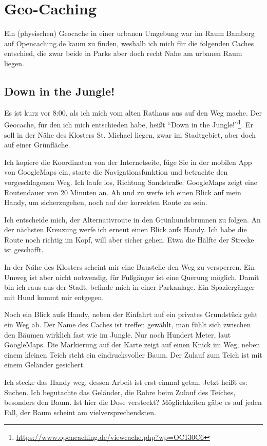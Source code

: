 \section{Geo-Caching}

Ein (physischen) Geocache in einer urbanen Umgebung war im Raum Bamberg auf Opencaching.de kaum zu finden, weshalb ich mich für die folgenden Caches entschied, die zwar beide in Parks aber doch recht Nahe am urbanen Raum liegen.

\subsection*{Down in the Jungle!}

Es ist kurz vor 8:00, als ich mich vom alten Rathaus aus auf den Weg mache. Der Geocache, für den ich mich entschieden habe, heißt \enquote{Down in the Jungle!}\footnote{\url{https://www.opencaching.de/viewcache.php?wp=OC130C6}}. Er soll in der Nähe des Klosters St. Michael liegen, zwar im Stadtgebiet, aber doch auf einer Grünfläche.

Ich kopiere die Koordinaten von der Internetseite, füge Sie in der mobilen App von GoogleMaps ein, starte die Navigationsfunktion und betrachte den vorgeschlagenen Weg. Ich laufe los, Richtung Sandstraße. GoogleMaps zeigt eine Routendauer von 20 Minuten an. Ab und zu werfe ich einen Blick auf mein Handy, um sicherzugehen, noch auf der korrekten Route zu sein.

Ich entscheide mich, der Alternativroute in den Grünhundsbrunnen zu folgen. An der nächsten Kreuzung werfe ich erneut einen Blick aufs Handy. Ich habe die Route noch richtig im Kopf, will aber sicher gehen. Etwa die Hälfte der Strecke ist geschafft.

In der Nähe des Klosters scheint mir eine Baustelle den Weg zu versperren. Ein Umweg ist aber nicht notwendig, für Fußgänger ist eine Querung möglich. Damit bin ich raus aus der Stadt, befinde mich in einer Parkanlage. Ein Spaziergänger mit Hund kommt mir entgegen.

Noch ein Blick aufs Handy, neben der Einfahrt auf ein privates Grundstück geht ein Weg ab. Der Name des Caches ist treffen gewählt, man fühlt sich zwischen den Bäumen wirklich fast wie im Jungle. Nur noch Hundert Meter, laut GoogleMaps. Die Markierung auf der Karte zeigt auf einen Knick im Weg, neben einem kleinen Teich steht ein eindrucksvoller Baum. Der Zulauf zum Teich ist mit einem Geländer gesichert.

Ich stecke das Handy weg, dessen Arbeit ist erst einmal getan. Jetzt heißt es: Suchen. Ich begutachte das Geländer, die Rohre beim Zulauf des Teiches, besonders den Baum. Ist hier die Dose versteckt? Möglichkeiten gäbe es auf jeden Fall, der Baum scheint am vielversprechendsten.

